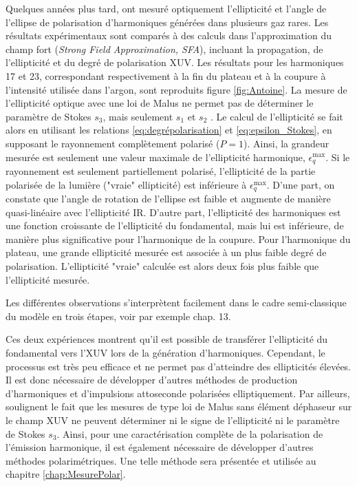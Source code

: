Quelques années plus tard,  ont mesuré optiquement l'ellipticité et l'angle de l'ellipse de polarisation d'harmoniques générées dans plusieurs gaz rares. Les résultats expérimentaux sont comparés à des calculs dans l'approximation du champ fort (\textit{Strong Field Approximation, SFA}), incluant la propagation, de l'ellipticité et du degré de polarisation XUV. Les résultats pour les harmoniques 17 et 23, correspondant respectivement à la fin du plateau et à la coupure à l'intensité utilisée dans l'argon, sont reproduits figure \ref{fig:Antoine}. La mesure de l'ellipticité optique avec une loi de Malus ne permet pas de déterminer le paramètre de Stokes $s_3$, mais seulement $s_1$ et $s_2$ . Le calcul de l'ellipticité se fait alors en utilisant les relations \ref{eq:degrépolarisation} et \ref{eq:epsilon_Stokes}, en supposant le rayonnement complètement polarisé ($P = 1$). Ainsi, la grandeur mesurée est seulement une valeur maximale de l'ellipticité harmonique, $\epsilon_q^{\text{max}}$. Si le rayonnement est seulement partiellement polarisé, l'ellipticité de la partie polarisée de la lumière ("vraie" ellipticité) est inférieure à $\epsilon_q^{\text{max}}$. D'une part, on constate que l'angle de rotation de l'ellipse est faible et augmente de manière quasi-linéaire avec l'ellipticité IR. D'autre part, l'ellipticité des harmoniques est une fonction croissante de l'ellipticité du fondamental, mais lui est inférieure, de manière plus significative pour l'harmonique de la coupure. Pour l'harmonique du plateau, une grande ellipticité mesurée est associée à un plus faible degré de polarisation. L'ellipticité "vraie" calculée est alors deux fois plus faible que l'ellipticité mesurée.

Les différentes observations s'interprètent facilement dans le cadre semi-classique du modèle en trois étapes, voir par exemple  chap. 13.

Ces deux expériences montrent qu'il est possible de transférer l'ellipticité du fondamental vers l'XUV lors de la génération d'harmoniques. Cependant, le processus est très peu efficace et ne permet pas d'atteindre des ellipticités élevées. Il est donc nécessaire de développer d'autres méthodes de production d'harmoniques et d'impulsions attoseconde polarisées elliptiquement. Par ailleurs,  soulignent le fait que les mesures de type loi de Malus sans élément déphaseur sur le champ XUV ne peuvent déterminer ni le signe de l'ellipticité ni le paramètre de Stokes $s_3$. Ainsi, pour une caractérisation complète de la polarisation de l'émission harmonique, il est également nécessaire de développer d'autres méthodes polarimétriques. Une telle méthode sera présentée et utilisée au chapitre \ref{chap:MesurePolar}.



